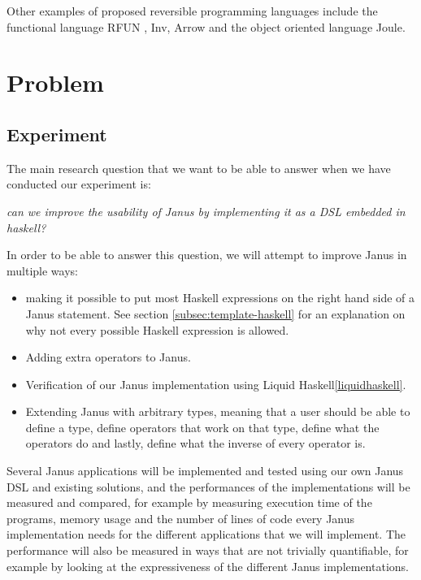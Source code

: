 \documentclass[12pt,a4paper]{article}
\begin{document}
Other examples of proposed reversible programming languages include the functional language RFUN \cite{yokoyama11}\cite{thomsen15}, Inv\cite{hu04}, Arrow\cite{rose15} and the object oriented language Joule\cite{schultz16}.

\section{Problem}
	\subsection{Experiment}
	The main research question that we want to be able to answer when we have conducted our experiment is:
	
	\begin{displayquote}
	\textit{can we improve the usability of Janus by implementing it as a DSL embedded in haskell?}
	\end{displayquote}
	
	\noindent In order to be able to answer this question, we will attempt to improve Janus in multiple ways:
	\begin{itemize}
		\item making it possible to put most Haskell expressions on the right hand side of a Janus statement. See section \ref{subsec:template-haskell} for an explanation on why not every possible Haskell expression is allowed.
		\item Adding extra operators to Janus.
		\item Verification of our Janus implementation using Liquid Haskell\ref{liquidhaskell}.
		\item Extending Janus with arbitrary types, meaning that a user should be able to define a type, define operators that work on that type, define what the operators do and lastly, define what the inverse of every operator is.
	\end{itemize}
	Several Janus applications will be implemented and tested using our own Janus DSL and existing solutions, and the performances of the implementations will be measured and compared, for example by measuring execution time of the programs, memory usage and the number of lines of code every Janus implementation needs for the different applications that we will implement. The performance will also be measured in ways that are not trivially quantifiable, for example by looking at the expressiveness of the different Janus implementations.
	
\end{document}
